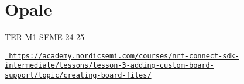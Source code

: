 \chapter{Opale}
\hypertarget{md__r_e_a_d_m_e}{}\label{md__r_e_a_d_m_e}
\label{md__r_e_a_d_m_e_autotoc_md9}%
%


TER M1 SEME 24-\/25

\href{https://academy.nordicsemi.com/courses/nrf-connect-sdk-intermediate/lessons/lesson-3-adding-custom-board-support/topic/creating-board-files/}{\texttt{ https\+://academy.\+nordicsemi.\+com/courses/nrf-\/connect-\/sdk-\/intermediate/lessons/lesson-\/3-\/adding-\/custom-\/board-\/support/topic/creating-\/board-\/files/}} 